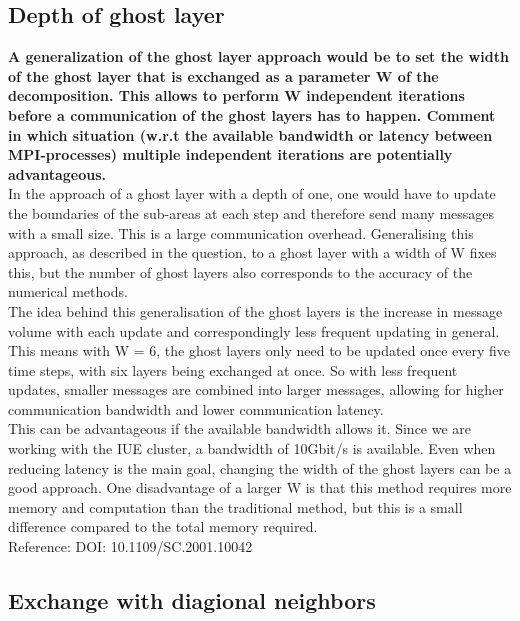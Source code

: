 \documentclass[10pt,a4paper]{article}
\begin{document}
\subsection{Depth of ghost layer}

\textbf{A generalization of the ghost layer approach would be to set the width of the ghost 
layer that is exchanged as a parameter W of the decomposition. This allows to perform W independent 
iterations before a communication of the ghost layers has to happen. Comment in which situation 
(w.r.t the available bandwidth or latency between MPI-processes) multiple independent iterations are 
potentially advantageous.} \\


In the approach of a ghost layer with a depth of one, one would have to update the boundaries of the sub-areas at 
each step and therefore send many messages with a small size. This is a large communication overhead. Generalising 
this approach, as described in the question, to a ghost layer with a width of W fixes this, but the number of ghost 
layers also corresponds to the accuracy of the numerical methods.\\

The idea behind this generalisation of the ghost layers is the increase in message volume with each update and 
correspondingly less frequent updating in general. This means with W = 6, the ghost layers only need to be updated 
once every five time steps, with six layers being exchanged at once. So with less frequent updates, smaller messages 
are combined into larger messages, allowing for higher communication bandwidth and lower communication latency. \\ 

This can be advantageous if the available bandwidth allows it. Since we are working with the IUE cluster, a bandwidth 
of 10Gbit/s is available. Even when reducing latency is the main goal, changing the width of the ghost layers can be 
a good approach. One disadvantage of a larger W is that this method requires more memory and computation than the 
traditional method, but this is a small difference compared to the total memory required. \\ 
 
Reference: DOI: 10.1109/SC.2001.10042 \\

\newpage
\subsection{Exchange with diagional neighbors}
\end{document}
